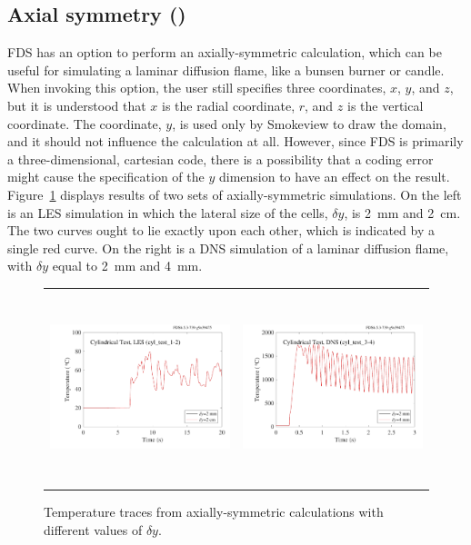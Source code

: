 \documentclass[11pt]{book}
\begin{document}
\subsection{Axial symmetry (\texorpdfstring{}{cyl\_test})}
\label{cyl_test}

FDS has an option to perform an axially-symmetric calculation, which can be useful for simulating a laminar diffusion flame, like a bunsen burner or candle. When invoking this option, the user still specifies three coordinates, $x$, $y$, and $z$, but it is understood that $x$ is the radial coordinate, $r$, and $z$ is the vertical coordinate. The coordinate, $y$, is used only by Smokeview to draw the domain, and it should not influence the calculation at all. However, since FDS is primarily a three-dimensional, cartesian code, there is a possibility that a coding error might cause the specification of the $y$ dimension to have an effect on the result. Figure~\ref{cyl_test_fig} displays results of two sets of axially-symmetric simulations. On the left is an LES simulation in which the lateral size of the cells, $\delta y$, is 2~mm and 2~cm. The two curves ought to lie exactly upon each other, which is indicated by a single red curve. On the right is a DNS simulation of a laminar diffusion flame, with $\delta y$ equal to 2~mm and 4~mm.

\begin{figure}[!ht]
\begin{tabular*}{\textwidth}{lr}
\includegraphics[height=2.2in]{SCRIPT_FIGURES/cyl_test} &
\includegraphics[height=2.2in]{SCRIPT_FIGURES/cyl_test_3-4}
\end{tabular*}
\caption[The  test cases]{Temperature traces from axially-symmetric calculations with different values of $\delta y$.}
\label{cyl_test_fig}
\end{figure}
\end{document}
